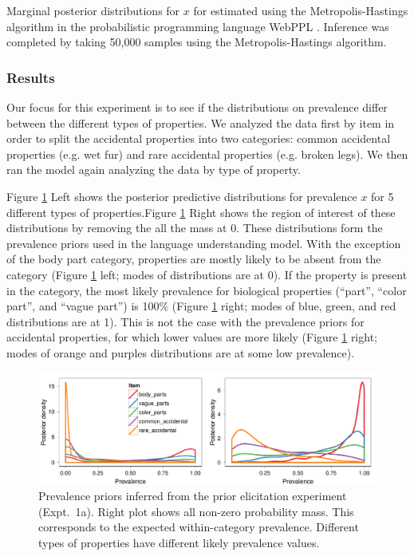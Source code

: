 \documentclass[10pt,letterpaper]{article}
\begin{document}
Marginal posterior distributions for $x$ for estimated using the Metropolis-Hastings algorithm in the probabilistic programming language WebPPL \cite{dippl}. Inference was completed by taking 50,000 samples using the Metropolis-Hastings algorithm.

\subsubsection{Results}

Our focus for this experiment is to see if the distributions on prevalence differ between the different types of properties.
We analyzed the data first by item in order to split the accidental properties into two categories: common accidental properties (e.g. wet fur) and rare accidental properties (e.g. broken legs). We then ran the model again analyzing the data by type of property.

Figure \ref{fig:prior2} Left shows the posterior predictive distributions for prevalence $x$ for 5 different types of properties.Figure \ref{fig:prior2} Right shows the region of interest of these distributions by removing the all the mass at 0. These distributions form the prevalence priors used in the language understanding model. 
With the exception of the body part category, properties are mostly likely to be absent from the category (Figure \ref{fig:prior2} left; modes of distributions are at 0).
If the property is present in the category, the most likely prevalence for biological properties (``part'', ``color part'', and ``vague part'') is 100\% (Figure \ref{fig:prior2} right; modes of blue, green, and red distributions are at 1).
This is not the case with the prevalence priors for accidental properties, for which lower values are more likely (Figure \ref{fig:prior2} right; modes of orange and purples distributions are at some low prevalence).


\begin{figure}
\centering
    \includegraphics[width=\columnwidth]{prior2_prevalenceprior-50k.pdf}
    \caption{Prevalence priors inferred from the prior elicitation experiment  (Expt.~1a). Right plot shows all non-zero probability mass. This corresponds to the expected within-category prevalence. Different types of properties have different likely prevalence values.}
  \label{fig:prior2}
\end{figure}
\end{document}
